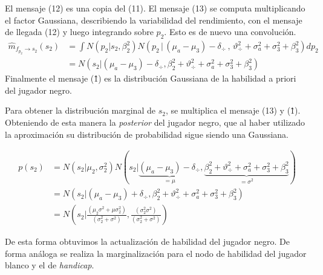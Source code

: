\documentclass[11pt,twoside, spanish]{report} %
\begin{document}
El mensaje (12) es una copia del (11).
El mensaje (13) se computa multiplicando el factor Gaussiana, describiendo la variabilidad del rendimiento, con el mensaje de llegada (12) y luego integrando sobre $p_2$.
Esto es de nuevo una convoluci\'on.
\begin{equation}
\begin{split}
\widehat{m}_{f_{p_2} \rightarrow s_2}(s_2) &= \int  N(p_2| s_2, \beta_2^2)  N( p_2 \,|\,  (\mu_a - \mu_3) - \delta_{\div}  \,,\,\vartheta_{\div}^2 + \sigma_a^2 + \sigma_3^2 + \beta_3^2)  dp_2 \\
&=  N( s_2|(\mu_a - \mu_3) - \delta_{\div}  ,\beta_2^2+ \vartheta_{\div}^2 + \sigma_a^2 + \sigma_3^2 + \beta_3^2)
\end{split}
\end{equation}
Finalmente el mensaje (\^{1}) es la distribuci\'on Gaussiana de la habilidad a priori del jugador negro.

Para obtener la distribuci\'on marginal de $s_2$, se multiplica el mensaje (13) y (\^{1}).
Obteniendo de esta manera la \textit{posterior} del jugador negro, que al haber utilizado la aproximaci\'on su distribuci\'on de probabilidad sigue siendo una Gaussiana.

\begin{equation}
\begin{split}
p(s_2) &= N( s_2|\mu_2,\sigma_2^2)  N( s_2| \underbrace{(\mu_a - \mu_3) - \delta_{\div}}_{=\mu}  , \underbrace{\beta_2^2+ \vartheta_{\div}^2 + \sigma_a^2 + \sigma_3^2 + \beta_3^2}_{=\sigma^2}) \\
&=  N( s_2|(\mu_a - \mu_3) + \delta_{\div}  ,\beta_2^2+ \vartheta_{\div}^2 + \sigma_a^2 + \sigma_3^2 + \beta_3^2) \\
&=  N\left(s_2|\frac{(\mu_2\sigma^2+\mu\sigma_2^2)}{(\sigma_2^2+\sigma^2)}, \frac{(\sigma_2^2\sigma^2)}{(\sigma_2^2+\sigma^2)}\right)
\end{split}
\end{equation}

De esta forma obtuvimos la actualizaci\'on de habilidad del jugador negro.
De forma an\'aloga se realiza la marginalizaci\'on para el nodo de habilidad del jugador blanco y el de \textit{handicap}.
\end{document}

